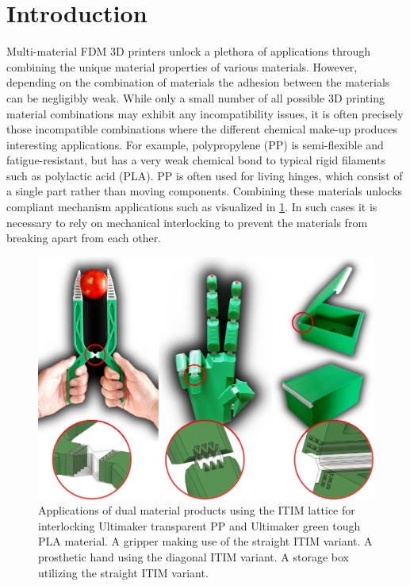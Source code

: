 \section{Introduction}
Multi-material FDM 3D printers unlock a plethora of applications through combining the unique material properties of various materials.
However, depending on the combination of materials the adhesion between the materials can be negligibly weak.
While only a small number of all possible 3D printing material combinations may exhibit any incompatibility issues,
it is often precisely those incompatible combinations where the different chemical make-up produces interesting applications.
For example, polypropylene (PP) is semi-flexible and fatigue-resistant, but has a very weak chemical bond to typical rigid filaments such as polylactic acid (PLA).
PP is often used for living hinges, which consist of a single part rather than moving components.
Combining these materials unlocks compliant mechanism applications such as visualized in \cref{fig:applications}.
In such cases it is necessary to rely on mechanical interlocking to prevent the materials from breaking apart from each other.


\begin{figure}
	\centering
	\includegraphics[width=\columnwidth]{sources-applications-applications.png}
	\caption{Applications of dual material products using the ITIM lattice for interlocking Ultimaker transparent PP and Ultimaker green tough PLA material.
	A gripper making use of the straight ITIM variant.
	A prosthetic hand using the diagonal ITIM variant.
	A storage box utilizing the straight ITIM variant.
	}
	\label{fig:applications}
\end{figure}






